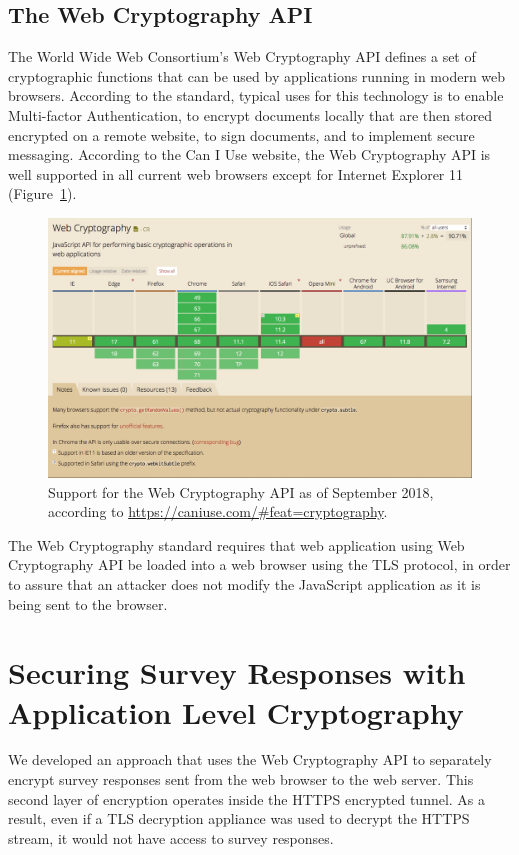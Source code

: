 \documentclass[fleqn,10pt]{wlscirep}
\begin{document}
\subsection{The Web Cryptography API}

The World Wide Web Consortium's Web Cryptography API\cite{wcapi}
defines a set of cryptographic functions that can be used by
applications running in modern web browsers. According to the
standard, typical uses for this technology is to enable Multi-factor
Authentication, to encrypt documents locally that are then stored
encrypted on a remote website, to sign documents, and to implement
secure messaging. According to the Can I Use website, the Web
Cryptography API is well supported in all current web browsers except
for Internet Explorer 11 (Figure~\ref{caniuse}).

\begin{figure}
  \includegraphics[width=\linewidth]{art/caniuse}
  \caption{Support for the Web Cryptography API as of September 2018,
    according to \url{https://caniuse.com/\#feat=cryptography}.\label{caniuse}}
\end{figure}

The Web Cryptography standard requires that web application using Web
Cryptography API be loaded into a web browser using the TLS protocol, in
order to assure that an attacker does not modify the JavaScript
application as it is being sent to the browser.

\section{Securing Survey Responses with Application Level Cryptography}
We developed an approach that uses the Web Cryptography API to
separately encrypt survey responses sent from the web browser to the
web server. This second layer of encryption operates inside the HTTPS
encrypted tunnel. As a result, even if a TLS decryption appliance was
used to decrypt the HTTPS stream, it would not have access to survey
responses.
\end{document}
